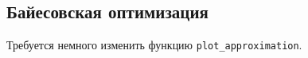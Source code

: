 \documentclass[11pt,a4paper]{article}
\begin{document}
    \begin{center}
    \end{center}
    
    \hypertarget{ux431ux430ux439ux435ux441ux43eux432ux441ux43aux430ux44f-ux43eux43fux442ux438ux43cux438ux437ux430ux446ux438ux44f}{%
\subsection{Байесовская
оптимизация}\label{ux431ux430ux439ux435ux441ux43eux432ux441ux43aux430ux44f-ux43eux43fux442ux438ux43cux438ux437ux430ux446ux438ux44f}}

    Требуется немного изменить функцию \texttt{plot\_approximation}.
\end{document}
